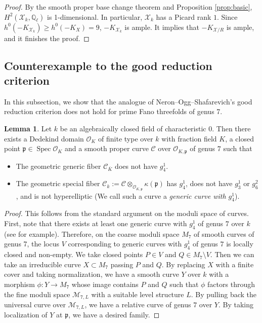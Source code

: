 \documentclass[autodetect-engine, a4paper]{amsart}
\theoremstyle{definition}
\newtheorem{lem}[thm]{Lemma}
\def\p{{\mathfrak p}}
\def\Q{{\mathbb Q}}
\def\cO{\mathcal{O}}
\DeclareMathOperator\Spec{\mathrm{Spec}}
\begin{document}
\begin{proof}
By the smooth proper base change theorem and Proposition \ref{prop:basic}, $H^2 (\mathcal{X}_{k}, \Q_{\ell}) $ is 1-dimensional.
In particular, $\mathcal{X}_{k}$ has a Picard rank $1$.
Since $h^0(-K_{\mathcal{X}_{k}}) \geq h^0(-K_{X}) = 9$, $-K_{\mathcal{X}_{k}}$ is ample.
It implies that $-K_{\mathcal{X}/R}$ is ample, and it finishes the proof. 
\end{proof}



\subsection{Counterexample to the good reduction criterion}
In this subsection, we show that the analogue of Neron--Ogg--Shafarevich's good reduction criterion does not hold for prime Fano threefolds of genus 7.

\begin{lem}
\label{lem:reductioncurveschar0}
Let $k$ be an algebraically closed field of characteristic $0$.
Then there exists a Dedekind domain $\cO_{K}$ of finite type over $k$ with fraction field $K$, a closed point $\p \in \Spec \cO_{K}$ 
and a smooth proper curve $\mathcal{C}$ over $\cO_{K,\p}$ of genus $7$ such that 
\begin{itemize}
\item 
The geometric generic fiber $\mathcal{C}_{\overline{K}}$ does not have $g_4^1$.
\item 
The geometric special fiber $\mathcal{C}_{k} := \mathcal{C} \otimes_{\cO_{K,\p}} \kappa(\p)$ has $g_4^1$, does not have $g_3^1$ or $g_6^2$, and is not hyperelliptic (We call such a curve a \emph{generic curve with $g_4^1$}).
\end{itemize}
\end{lem}

\begin{proof}
This follows from the standard argument on the moduli space of curves.
First, note that there exists at least one generic curve with $g_4^1$ of genus $7$ over $k$ (see \cite{Mukaicurve3} for example).
Therefore, on the coarse moduli space $M_{7}$ of smooth curves of genus 7,
the locus $V$ 
corresponding to generic curves with $g_4^1$ of genus $7$ is locally closed and non-empty.
We take closed points $P \in V$ and $Q \in M_{7} \setminus V$.
Then we can take an irreducible curve $X \subset M_{7}$ passing $P$ and $Q$.
By replacing $X$ with a finite cover and taking normalization, we have a smooth curve $Y$ over $k$ with a morphism $\phi\colon Y \rightarrow M_{7}$ whose image contains $P$ and $Q$ such that $\phi$ factors through the fine moduli space $\mathcal{M}_{7,L}$ with a suitable level structure $L$.
By pulling back the universal curve over $\mathcal{M}_{7,L}$, we have a relative curve of genus $7$ over $Y$. 
By taking localization of $Y$ at $\p$, we have a desired family.
\end{proof}
\end{document}
